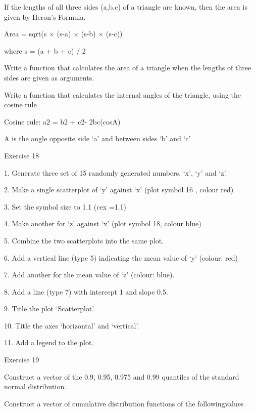 If the lengths of all three sides (a,b,c) of a triangle are known, then the area is given by Heron's Formula.

Area = sqrt(s × (s-a) × (s-b) × (s-c))

 

where s = (a + b + c) / 2

 

Write a function that calculates the area of a triangle when the lengths of three sides are given as arguments.

 

Write a function that calculates the internal angles of the triangle, using the cosine rule

Cosine rule: a2 = b2 + c2- 2bc(cosA)

 

A is the angle opposite side ‘a’ and between sides ‘b’ and ‘c’

 

Exercise 18

 
1.
Generate three set of 15 randomly generated numbers, ‘x’, ‘y’ and ‘z’.

2.
Make a single scatterplot of ‘y’ against ‘x’               (plot symbol 16 , colour red)

3.
Set the symbol size to 1.1                                           (cex =1.1)

4.
Make another for ‘z’ against ‘x’                             (plot symbol 18, colour blue)

5.
Combine the two scatterplots into the same plot.

6.
Add a vertical line (type 5) indicating the mean value of ‘y’ (colour: red)

7.
Add another for the mean value of ‘z’                (colour: blue).

8.
Add a line (type 7) with intercept 1 and slope 0.5.

9.
Title the plot ‘Scatterplot’.

10.
Title the axes ‘horizontal’ and ‘vertical’.

11.
Add a legend to the plot.


 

Exercise 19

 

Construct a vector of the 0.9, 0.95, 0.975 and 0.99 quantiles of the standard normal distribution.

 

Construct a vector of cumulative distribution functions of the followingvalues

